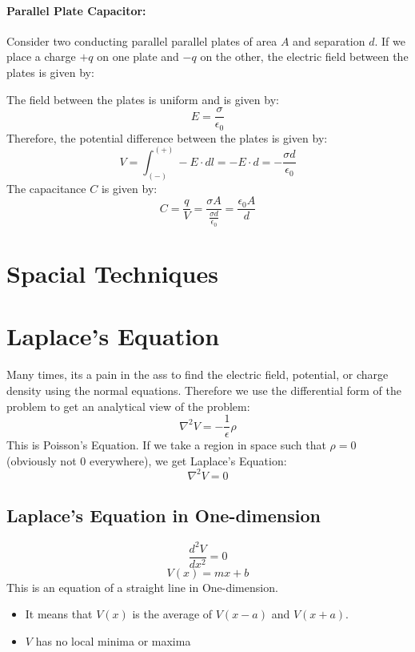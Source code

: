 \documentclass{article}
\begin{document}
\paragraph{Parallel Plate Capacitor:}
Consider two conducting parallel parallel plates of area $A$ and separation $d$.
If we place a charge $+q$ on one plate and $-q$ on the other, the electric field between the plates is given by:
\begin{figure}[H]
	\centering
\end{figure}
The field between the plates is uniform and is given by:
\[ E = \frac{\sigma}{\epsilon_0} \]
Therefore, the potential difference between the plates is given by:
\[ V = \int_{(-)}^{(+)} -E\cdot dl = -E\cdot d = -\frac{\sigma d}{\epsilon_0} \]
The capacitance $C$ is given by:
\[ C = \frac{q}{V} = \frac{\sigma A}{\frac{\sigma d}{\epsilon_0}} = \frac{\epsilon_0 A}{d} \]

\section*{Spacial Techniques}
\section{Laplace's Equation}
Many times, its a pain in the ass to find the electric field, potential, or charge density using the normal equations.
Therefore we use the differential form of the problem to get an analytical view of the problem:
\[ \nabla^2 V = - \frac{1}{\epsilon}\rho\]
This is Poisson's Equation.
If we take a region in space such that \( \rho = 0 \) (obviously not \(0\) everywhere), we get Laplace's Equation:
\[ \nabla^2 V = 0\]

\subsection{Laplace's Equation in One-dimension}
\[ \frac{d^2 V}{dx^2} = 0\]
\[ V(x) = mx + b \]
This is an equation of a straight line in One-dimension.
\begin{itemize}
	\item It means that \(V(x)\) is the average of \(V(x-a)\) and \(V(x+a)\).
	\item \(V\) has no local minima or maxima
\end{itemize}
\end{document}
